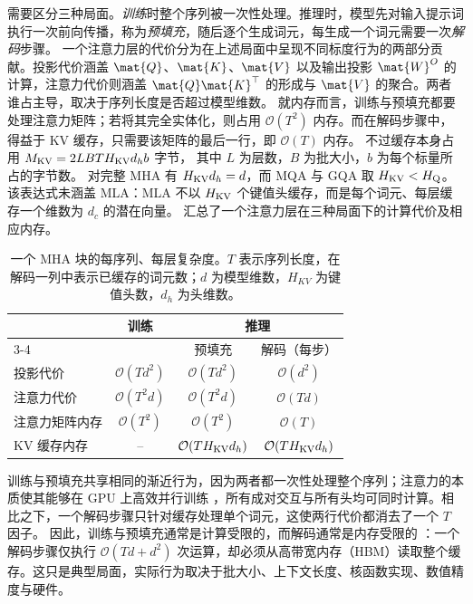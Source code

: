 需要区分三种局面。\emph{训练}时整个序列被一次性处理。推理时，模型先对输入提示词执行一次前向传播，称为\textit{预填充}，随后逐个生成词元，每生成一个词元需要一次\textit{解码}步骤。
一个注意力层的代价分为在上述局面中呈现不同标度行为的两部分贡献。投影代价涵盖 $\mat{Q}$、$\mat{K}$、$\mat{V}$ 以及输出投影 $\mat{W}^O$ 的计算，注意力代价则涵盖 $\mat{Q}\mat{K}^\top$ 的形成与 $\mat{V}$ 的聚合。两者谁占主导，取决于序列长度是否超过模型维数。
就内存而言，训练与预填充都要处理注意力矩阵；若将其完全实体化，则占用 $\mathcal{O}(T^2)$ 内存。而在解码步骤中，得益于 KV 缓存，只需要该矩阵的最后一行，即 $\mathcal{O}(T)$ 内存。
不过缓存本身占用 $M_{\rm KV} = 2 L B T H_{\rm KV} d_h b$ 字节，
其中 $L$ 为层数，$B$ 为批大小，$b$ 为每个标量所占的字节数。
对完整 MHA 有 $H_{\rm KV} d_h = d$，而 MQA 与 GQA 取 $H_{\rm KV} < H_{\rm Q}$。该表达式未涵盖 MLA：MLA 不以 $H_{\rm KV}$ 个键值头缓存，而是每个词元、每层缓存一个维数为 $d_c$ 的潜在向量。
 汇总了一个注意力层在三种局面下的计算代价及相应内存。
\begin{table}[h]
\centering
\caption{一个 MHA 块的每序列、每层复杂度。$T$ 表示序列长度，在解码一列中表示已缓存的词元数；$d$ 为模型维数，$H_{KV}$ 为键值头数，$d_h$ 为头维数。}
\label{tab:attention-complexity}
\begin{tabular}{lccc}
\toprule
 & \multirow{2}{*}{训练} & \multicolumn{2}{c}{推理} \\
\cmidrule(lr){3-4}
 & & 预填充 & 解码（每步） \\
\midrule
投影代价 & $\mathcal{O}(T d^2)$ & $\mathcal{O}(T d^2)$ & $\mathcal{O}(d^2)$ \\
注意力代价 & $\mathcal{O}(T^2 d)$ & $\mathcal{O}(T^2 d)$ & $\mathcal{O}(T d)$ \\
\midrule
注意力矩阵内存 & $\mathcal{O}(T^2)$ & $\mathcal{O}(T^2)$ & $\mathcal{O}(T)$ \\
KV 缓存内存 & -- & $\mathcal{O}(T H_{\rm KV} d_h)$ & $\mathcal{O}(T H_{\rm KV} d_h)$ \\
\bottomrule
\end{tabular}
\end{table}

训练与预填充共享相同的渐近行为，因为两者都一次性处理整个序列；注意力的本质使其能够在 GPU 上高效并行训练 \cite{vaswani2017attention}，所有成对交互与所有头均可同时计算。相比之下，一个解码步骤只针对缓存处理单个词元，这使两行代价都消去了一个 $T$ 因子。
因此，训练与预填充通常是计算受限的，而解码通常是内存受限的 \cite{yuan2024efficientinferencesurvey2}：一个解码步骤仅执行 $\mathcal{O}(Td + d^2)$ 次运算，却必须从高带宽内存（HBM）读取整个缓存。这只是典型局面，实际行为取决于批大小、上下文长度、核函数实现、数值精度与硬件。


